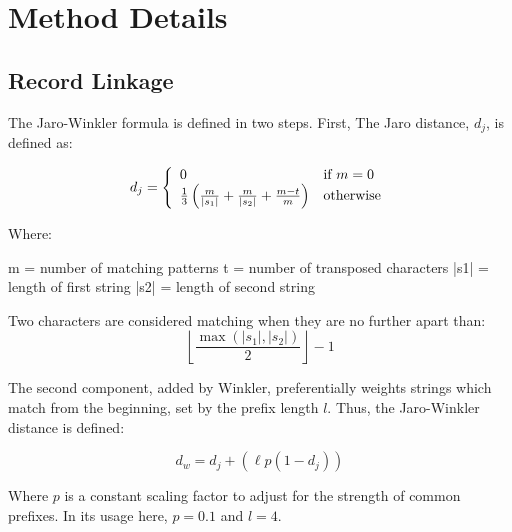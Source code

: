 \chapter{Method Details}

\section{Record Linkage}
\label{sec:record-linkage-appendix}

The Jaro-Winkler formula is defined in two steps. First, The Jaro distance, $d_j $, is defined as:


\begin{equation}
  d_j = \left\{
  \begin{array}{l l}
    0 & \text{if }m = 0 \\ 
    \frac{1}{3}\left(\frac{m}{|s_1|} + \frac{m}{|s_2|} + \frac{m-t}{m}\right) & \text{otherwise} \end{array} \right.
\end{equation}

Where:

m = number of matching patterns
t = number of transposed characters
|s1| = length of first string
|s2| = length of second string

Two characters are considered matching when they are no further apart than:
\begin{equation}
  \left\lfloor\frac{\max(|s_1|,|s_2|)}{2}\right\rfloor-1
\end{equation}

The second component, added by Winkler, preferentially weights strings which match from the beginning, set by the prefix length $ l $.  Thus, the Jaro-Winkler distance is defined:

\begin{equation}
  d_w = d_j + (\ell p (1 - d_j))
\end{equation}

Where $ p $ is a constant scaling factor to adjust for the strength of common prefixes. In its usage here, $ p = 0.1 $ and $ l = 4 $.


